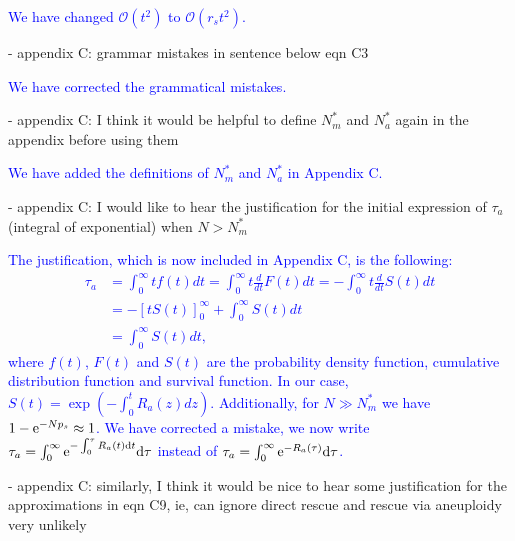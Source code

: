 \documentclass[12pt]{extarticle}
\renewcommand{\d}{{\rm d}}
\newcommand{\e}{{\rm e}}
\renewcommand{\Delta}{r}
\begin{document}
\textcolor{blue}{We have changed $\mathcal{O}\left(t^2\right)$ to $\mathcal{O}\left(\Delta_st^2\right)$. } %

- appendix C: grammar mistakes in sentence below eqn C3

\textcolor{blue}{We have corrected the grammatical mistakes. } %

- appendix C: I think it would be helpful to define $N_m^*$ and $N_a^*$ again in the appendix before using them

\textcolor{blue}{We have added the definitions of $N_m^*$ and $N_a^*$ in Appendix C. } %

- appendix C: I would like to hear the justification for the initial expression of $\tau_a$ (integral of exponential) when $N>N_m^*$

\textcolor{blue}{%
The justification, which is now included in Appendix C, is the following: 
\begin{align*}
\tau_a&=\int_0^\infty tf(t)dt=\int_0^\infty t\frac{d}{dt}F(t)dt=-\int_0^\infty t\frac{d}{dt}S(t)dt\\
&=-\left[tS(t)\right]_0^\infty+\int_0^\infty S(t)dt\\
&=\int_0^\infty S(t)dt,
\end{align*}
where $f(t)$, $F(t)$ and $S(t)$ are the probability density function, cumulative distribution function and survival function.
In our case, $S(t)=\exp\left(-\int_0^t R_a(z)dz\right)$.
Additionally, for $N\gg N_m^*$ we have $1-\e^{-Np_s}\approx1$. 
We have corrected a mistake, we now write $\tau_a=\int_0^\infty \e^{-\int_0^\tau R_a(t)\d t}\d\tau$
instead of $\tau_a=\int_0^\infty \e^{-R_a(\tau)}\d\tau$.
}

- appendix C: similarly, I think it would be nice to hear some justification for the approximations in eqn C9, ie, can ignore direct rescue and rescue via aneuploidy very unlikely
\end{document}
